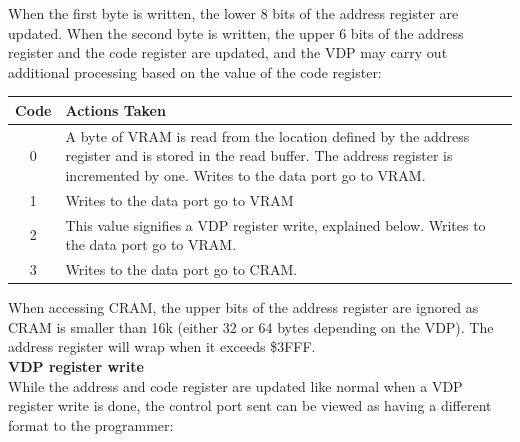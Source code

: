 \documentclass{article}
\begin{document}
When the first byte is written, the lower 8 bits of the address register are
updated. When the second byte is written, the upper 6 bits of the address
register and the code register are updated, and the VDP may carry out
additional processing based on the value of the code register:

\begin{table}[H]
    \centering
    \begin{tabular}{cp{5in}}
        \toprule
        \textbf{Code} & \textbf{Actions Taken} \\
        \midrule
            0 & A byte of VRAM is read from the location defined by
                the address register and is stored in the read buffer.
                The address register is incremented by one. Writes to
                the data port go to VRAM.                                     \\
            1 & Writes to the data port go to VRAM                            \\
            2 & This value signifies a VDP register write, explained below.
                Writes to the data port go to VRAM.                           \\
            3 & Writes to the data port go to CRAM.                           \\
        \bottomrule
    \end{tabular}
\end{table}


When accessing CRAM, the upper bits of the address register are ignored as CRAM
is smaller than 16k (either 32 or 64 bytes depending on the VDP). The address
register will wrap when it exceeds \$3FFF.                                      \\

\textbf{VDP register write}                                                     \\

While the address and code register are updated like normal when a VDP register
write is done, the control port sent can be viewed as having a different format
to the programmer:
\end{document}
